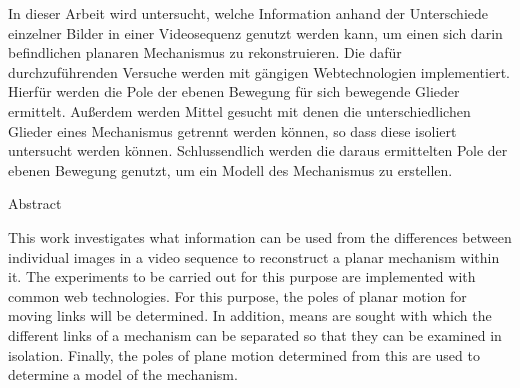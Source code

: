 %
\label{sec:abstract}

In dieser Arbeit wird untersucht, welche Information anhand der Unterschiede einzelner Bilder in einer Videosequenz genutzt werden kann, um einen sich darin befindlichen planaren Mechanismus zu rekonstruieren.
Die dafür durchzuführenden Versuche werden mit gängigen Webtechnologien implementiert.
Hierfür werden die Pole der ebenen Bewegung für sich bewegende Glieder ermittelt.
Au{\ss}erdem werden Mittel gesucht mit denen die unterschiedlichen Glieder eines Mechanismus getrennt werden können, so dass diese isoliert untersucht werden können.
Schlussendlich werden die daraus ermittelten Pole der ebenen Bewegung genutzt, um ein Modell des Mechanismus zu erstellen.

\vspace*{20mm}

{Abstract}
\label{sec:abstract-diff}

This work investigates what information can be used from the differences between individual images in a video sequence to reconstruct a planar mechanism within it.
The experiments to be carried out for this purpose are implemented with common web technologies.
For this purpose, the poles of planar motion for moving links will be determined.
In addition, means are sought with which the different links of a mechanism can be separated so that they can be examined in isolation.
Finally, the poles of plane motion determined from this are used to determine a model of the mechanism.
